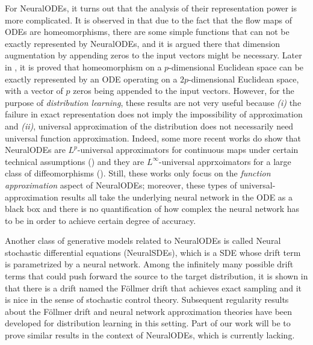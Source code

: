 For NeuralODEs, it turns out that the analysis of their representation power is more complicated. It is observed in \cite{Augmented} that due to the fact that the flow maps of ODEs are homeomorphisms, there are some simple functions that can not be exactly represented by NeuralODEs, and it is argued there that dimension augmentation by appending zeros to the input vectors might be necessary. Later in \cite{ApproximationCapability}, it is proved that homeomorphism on a $p$-dimensional Euclidean space can be exactly represented by an ODE operating on a $2p$-dimensional Euclidean space, with a vector of $p$ zeros being appended to the input vectors. However, for the purpose of \textit{distribution learning}, these results are not very useful because \textit{(i)} the failure in exact representation does not imply the impossibility of approximation and \textit{(ii)}, universal approximation of the distribution does not necessarily need universal function approximation. Indeed, some more recent works do show that NeuralODEs are $L^p$-universal approximators for continuous maps under certain technical assumptions (\cite{DynamicalSystem}) and they are $L^\infty$-universal apprxoimators for a large class of diffeomorphisms (\cite{SupApproximation}). Still, these works only focus on the \textit{function approximation} aspect of NeuralODEs; moreover, these types of universal-approximation results all take the underlying neural network in the ODE as a black box and there is no quantification of how complex the neural network has to be in order to achieve certain degree of accuracy. 

Another class of generative models related to NeuralODEs is called Neural stochastic differential equations (NeuralSDEs), which is a SDE whose drift term is parametrized by a neural network. Among the infinitely many possible drift terms that could push forward the source to the target distribution, it is shown in \cite{NeuralSDE} that there is a  drift named the F\"ollmer drift that achieves exact sampling and it is nice in the sense of stochastic control theory. Subsequent regularity results about the F\"ollmer drift and neural network approximation theories have been developed for distribution learning in this setting. Part of our work will be to prove similar results in the context of NeuralODEs, which is currently lacking. 

